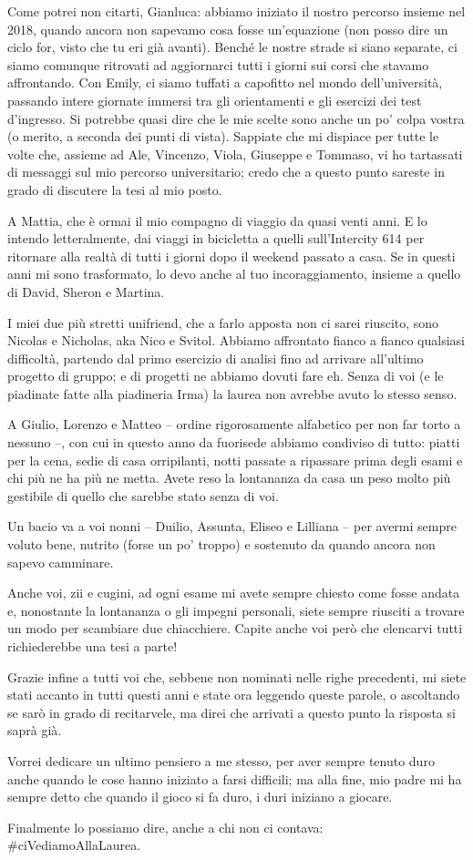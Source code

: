 Come potrei non citarti, Gianluca: abbiamo iniziato il nostro percorso insieme nel 2018, quando ancora non sapevamo cosa fosse un'equazione (non posso dire un ciclo for, visto che tu eri già avanti).
Benché le nostre strade si siano separate, ci siamo comunque ritrovati ad aggiornarci tutti i giorni sui corsi che stavamo affrontando.
Con Emily, ci siamo tuffati a capofitto nel mondo dell'università, passando intere giornate immersi tra gli orientamenti e gli esercizi dei test d'ingresso.
Si potrebbe quasi dire che le mie scelte sono anche un po' colpa vostra (o merito, a seconda dei punti di vista).
Sappiate che mi dispiace per tutte le volte che, assieme ad Ale, Vincenzo, Viola, Giuseppe e Tommaso, vi ho tartassati di messaggi sul mio percorso universitario; credo che a questo punto sareste in grado di discutere la tesi al mio posto.

A Mattia, che è ormai il mio compagno di viaggio da quasi venti anni.
E lo intendo letteralmente, dai viaggi in bicicletta a quelli sull'Intercity 614 per ritornare alla realtà di tutti i giorni dopo il weekend passato a casa.
Se in questi anni mi sono trasformato, lo devo anche al tuo incoraggiamento, insieme a quello di David, Sheron e Martina.

I miei due più stretti unifriend, che a farlo apposta non ci sarei riuscito, sono Nicolas e Nicholas, aka Nico e Svitol.
Abbiamo affrontato fianco a fianco qualsiasi difficoltà, partendo dal primo esercizio di analisi fino ad arrivare all'ultimo progetto di gruppo; e di progetti ne abbiamo dovuti fare eh.
Senza di voi (e le piadinate fatte alla piadineria Irma) la laurea non avrebbe avuto lo stesso senso.

A Giulio, Lorenzo e Matteo -- ordine rigorosamente alfabetico per non far torto a nessuno --, con cui in questo anno da fuorisede abbiamo condiviso di tutto: piatti per la cena, sedie di casa orripilanti, notti passate a ripassare prima degli esami e chi più ne ha più ne metta.
Avete reso la lontananza da casa un peso molto più gestibile di quello che sarebbe stato senza di voi.

Un bacio va a voi nonni -- Duilio, Assunta, Eliseo e Lilliana -- per avermi sempre voluto bene, nutrito (forse un po' troppo) e sostenuto da quando ancora non sapevo camminare.

Anche voi, zii e cugini, ad ogni esame mi avete sempre chiesto come fosse andata e, nonostante la lontananza o gli impegni personali, siete sempre riusciti a trovare un modo per scambiare due chiacchiere.
Capite anche voi però che elencarvi tutti richiederebbe una tesi a parte!

Grazie infine a tutti voi che, sebbene non nominati nelle righe precedenti, mi siete stati accanto in tutti questi anni e state ora leggendo queste parole, o ascoltando se sarò in grado di recitarvele, ma direi che arrivati a questo punto la risposta si saprà già.

Vorrei dedicare un ultimo pensiero a me stesso, per aver sempre tenuto duro anche quando le cose hanno iniziato a farsi difficili; ma alla fine, mio padre mi ha sempre detto che quando il gioco si fa duro, i duri iniziano a giocare.

Finalmente lo possiamo dire, anche a chi non ci contava:\\
\#ciVediamoAllaLaurea.
